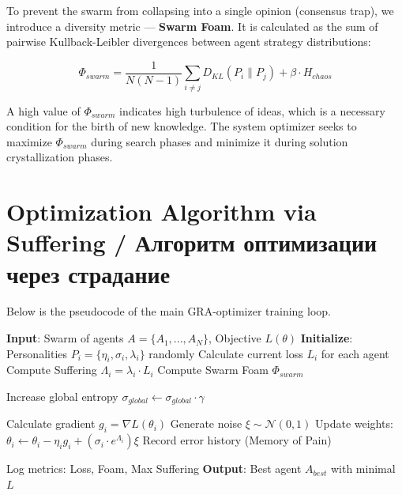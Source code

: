 \documentclass[12pt, a4paper]{article}
\begin{document}
To prevent the swarm from collapsing into a single opinion (consensus trap), we introduce a diversity metric — \textbf{Swarm Foam}. It is calculated as the sum of pairwise Kullback-Leibler divergences between agent strategy distributions:

\begin{equation}
    \Phi_{swarm} = \frac{1}{N(N-1)} \sum_{i \neq j} D_{KL}(P_i \| P_j) + \beta \cdot H_{chaos}
\end{equation}

A high value of $\Phi_{swarm}$ indicates high turbulence of ideas, which is a necessary condition for the birth of new knowledge. The system optimizer seeks to maximize $\Phi_{swarm}$ during search phases and minimize it during solution crystallization phases.

\section{Optimization Algorithm via Suffering / Алгоритм оптимизации через страдание}

Below is the pseudocode of the main GRA-optimizer training loop.

\begin{algorithm}[H]
\caption{GRA Optimization Loop with Suffering Dynamics}
\begin{algorithmic}[1]
\State \textbf{Input}: Swarm of agents $A = \{A_1, ..., A_N\}$, Objective $L(\theta)$
\State \textbf{Initialize}: Personalities $P_i = \{\eta_i, \sigma_i, \lambda_i\}$ randomly
    \State Calculate current loss $L_i$ for each agent
    \State Compute Suffering $\Lambda_i = \lambda_i \cdot L_i$
    \State Compute Swarm Foam $\Phi_{swarm}$
    
     
        \State Increase global entropy $\sigma_{global} \leftarrow \sigma_{global} \cdot \gamma$
    \EndIf
    
        \State Calculate gradient $g_i = \nabla L(\theta_i)$
        \State Generate noise $\xi \sim \mathcal{N}(0, 1)$
        \State Update weights: $\theta_i \leftarrow \theta_i - \eta_i g_i + (\sigma_i \cdot e^{\Lambda_i}) \xi$
        \State Record error history (Memory of Pain)
    \EndFor
    
    \State Log metrics: Loss, Foam, Max Suffering
\EndFor
\State \textbf{Output}: Best agent $A_{best}$ with minimal $L$
\end{algorithmic}
\end{algorithm}
\end{document}
